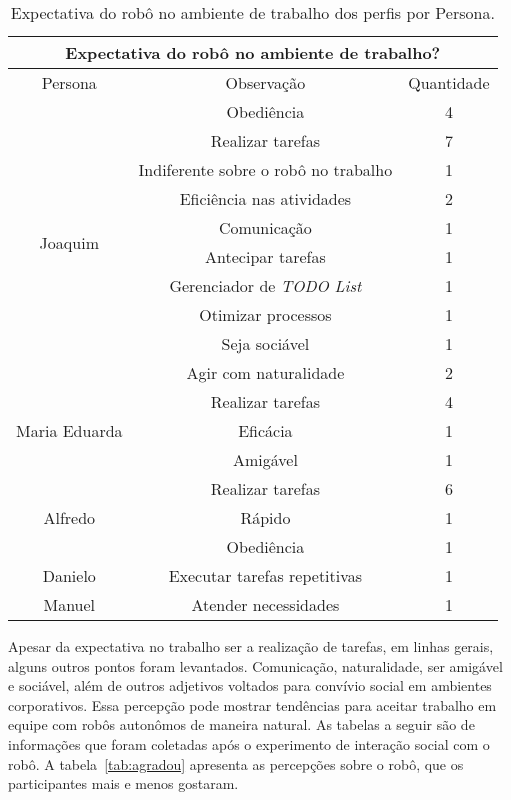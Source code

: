 \begin{table}[!ht]
	\caption{Expectativa do robô no ambiente de trabalho dos perfis por Persona.}
	\label{tab:expectativatrabalho}
	\centering
	\begin{tabular}{c | c | c }
        \hline
        \multicolumn{3}{c}{Expectativa do robô no ambiente de trabalho?} \\
        \hline
        Persona & Observação & Quantidade \\
        \hline
        \multirow{10}{*}{Joaquim} & Obediência & 4 \\
        \hhline{~--}
        & Realizar tarefas & 7 \\
        \hhline{~--}
        & Indiferente sobre o robô no trabalho & 1 \\
        \hhline{~--}
        & Eficiência nas atividades & 2 \\
        \hhline{~--}
        & Comunicação & 1 \\
        \hhline{~--}
        & Antecipar tarefas & 1 \\
        \hhline{~--}
        & Gerenciador de \emph{TODO List} & 1 \\
        \hhline{~--}
        & Otimizar processos & 1 \\
        \hhline{~--}
        & Seja sociável & 1 \\
        \hhline{~--}
        & Agir com naturalidade & 2 \\
        \hline
        \multirow{3}{*}{Maria Eduarda} & Realizar tarefas & 4 \\
        \hhline{~--}
        & Eficácia & 1 \\
        \hhline{~--}
        & Amigável & 1 \\
        \hline
        \multirow{3}{*}{Alfredo} & Realizar tarefas & 6 \\
        \hhline{~--}
        & Rápido & 1 \\
        \hhline{~--}
        & Obediência & 1 \\
        \hline
        Danielo & Executar tarefas repetitivas & 1 \\
        \hline
        Manuel & Atender necessidades & 1 \\
        \hline
    \end{tabular}
\end{table}

Apesar da expectativa no trabalho ser a realização de tarefas, em linhas gerais, alguns outros pontos foram levantados. Comunicação, naturalidade, ser amigável e sociável, além de outros adjetivos voltados para convívio social em ambientes corporativos. Essa percepção pode mostrar tendências para aceitar trabalho em equipe com robôs autonômos de maneira natural. As tabelas a seguir são de informações que foram coletadas após o experimento de interação social com o robô. A tabela~\ref{tab:agradou} apresenta as percepções sobre o robô, que os participantes mais e menos gostaram.

